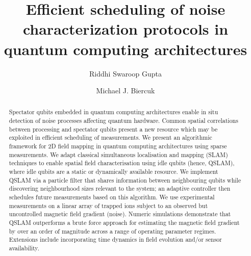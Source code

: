
\title{Efficient scheduling of noise characterization protocols in quantum computing architectures}

\author{Riddhi Swaroop Gupta} 

\author{Michael J. Biercuk}

\begin{abstract}
Spectator qubits embedded in quantum computing architectures enable in situ detection of noise processes affecting quantum hardware. Common spatial correlations between processing and spectator qubits present a new resource which may be exploited in efficient scheduling of measurements. We present an algorithmic framework for 2D field mapping in quantum computing architectures using sparse measurements. We adapt classical simultaneous localisation and mapping (SLAM) techniques to enable spatial field characterisation using idle qubits (hence, QSLAM), where idle qubits are a static or dynamically available resource. We implement QSLAM via a particle filter that shares information between neighbouring qubits while discovering neighbourhood sizes relevant to the system; an adaptive controller then schedules future measurements based on this algorithm. We use experimental measurements on a linear array of trapped ions subject to an observed but uncontrolled magnetic field gradient (noise). Numeric simulations demonstrate that QSLAM outperforms a brute force approach for estimating the magnetic field gradient by over an order of magnitude across a range of operating parameter regimes. Extensions include incorporating time dynamics in field evolution and/or sensor availability.
\end{abstract}

\maketitle
